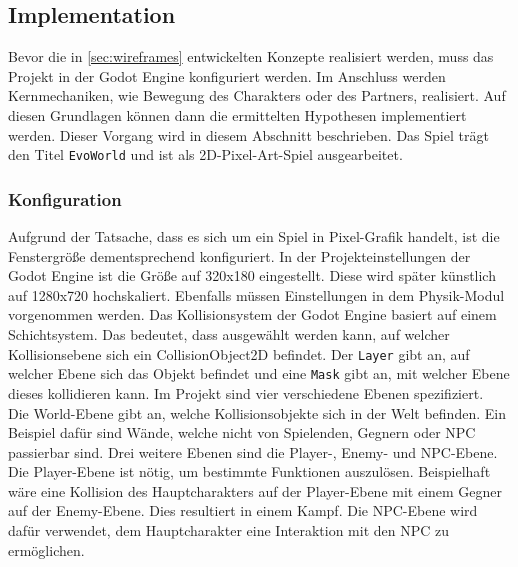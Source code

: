 \subsection{Implementation}
Bevor die in \autoref{sec:wireframes} entwickelten Konzepte realisiert werden, muss das Projekt in der Godot Engine konfiguriert werden. Im Anschluss werden Kernmechaniken, wie Bewegung des Charakters oder des Partners, realisiert. Auf diesen Grundlagen können dann die ermittelten Hypothesen implementiert werden. Dieser Vorgang wird in diesem Abschnitt beschrieben. Das Spiel trägt den Titel \texttt{EvoWorld} und ist als 2D-Pixel-Art-Spiel ausgearbeitet. 

\subsubsection{Konfiguration}
Aufgrund der Tatsache, dass es sich um ein Spiel in Pixel-Grafik handelt, ist die Fenstergröße dementsprechend konfiguriert. In der Projekteinstellungen der Godot Engine ist die Größe auf 320x180 eingestellt. Diese wird später künstlich auf 1280x720 hochskaliert. Ebenfalls müssen Einstellungen in dem Physik-Modul vorgenommen werden. Das Kollisionsystem der Godot Engine basiert auf einem Schichtsystem\cite{godot-collision}. Das bedeutet, dass ausgewählt werden kann, auf welcher Kollisionsebene sich ein CollisionObject2D befindet. Der \texttt{Layer} gibt an, auf welcher Ebene sich das Objekt befindet und eine \texttt{Mask} gibt an, mit welcher Ebene dieses kollidieren kann. Im Projekt sind vier verschiedene Ebenen spezifiziert.\\

Die World-Ebene gibt an, welche Kollisionsobjekte sich in der Welt befinden. Ein Beispiel dafür sind Wände, welche nicht von Spielenden, Gegnern oder \ac{NPC} passierbar sind. Drei weitere Ebenen sind die Player-, Enemy- und \ac{NPC}-Ebene. Die Player-Ebene ist nötig, um bestimmte Funktionen auszulösen. Beispielhaft wäre eine Kollision des Hauptcharakters auf der Player-Ebene mit einem Gegner auf der Enemy-Ebene. Dies resultiert in einem Kampf. Die \ac{NPC}-Ebene wird dafür verwendet, dem Hauptcharakter eine Interaktion mit den \ac{NPC} zu ermöglichen.

